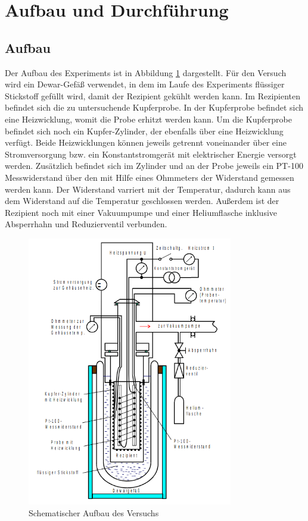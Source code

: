 \section{Aufbau und Durchführung}
\label{sec:AundD}

\subsection{Aufbau}
\label{sec:Aufbau}

Der Aufbau des Experiments ist in Abbildung \ref{fig:aufbau} dargestellt. Für den Versuch wird ein Dewar-Gefäß verwendet, in dem im Laufe des Experiments flüssiger Stickstoff gefüllt wird, damit der
Rezipient gekühlt werden kann. Im Rezipienten befindet sich die zu untersuchende Kupferprobe. In der Kupferprobe befindet sich eine Heizwicklung, womit die Probe erhitzt werden kann. Um die Kupferprobe befindet sich noch ein Kupfer-Zylinder, der ebenfalls über eine Heizwicklung verfügt. Beide Heizwicklungen können jeweils getrennt voneinander über eine Stromversorgung bzw. ein Konstantstromgerät mit elektrischer Energie versorgt werden. Zusätzlich befindet sich im Zylinder und an der Probe jeweils ein PT-100 Messwiderstand über den mit Hilfe eines Ohmmeters der Widerstand gemessen werden kann. Der Widerstand varriert mit der Temperatur, dadurch kann aus dem Widerstand auf die Temperatur geschlossen werden. Außerdem ist der Rezipient noch mit einer Vakuumpumpe und einer Heliumflasche inklusive Absperrhahn und Reduzierventil verbunden. 

\begin{figure}[H]
    \centering
    \includegraphics[width=0.8\textwidth]{build/Aufbau.PNG}
    \caption{Schematischer Aufbau des Versuchs} %
    \label{fig:aufbau}
\end{figure}

